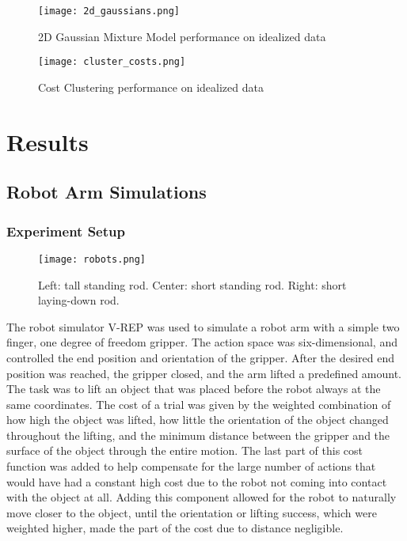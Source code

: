 \documentclass[12pt]{article}
\begin{document}
\begin{figure}[ht]
  \centerline{
  \texttt{[image: 2d\_gaussians.png]}}
  \caption{\label{fig_label} 2D Gaussian Mixture Model performance on idealized data}
  \label{fig:2Dgaussians}
\end{figure}

\begin{figure}[ht]
  \centerline{
  \texttt{[image: cluster\_costs.png]}}
  \caption{\label{fig_label} Cost Clustering performance on idealized data}
  \label{fig:clustercosts}
\end{figure}

\section{Results}
\subsection{Robot Arm Simulations}
\subsubsection{Experiment Setup}

\begin{figure}[ht]
  \centering
  \texttt{[image: robots.png]}
  \caption{\label{fig_label} Left: tall standing rod. Center: short standing rod. Right: short laying-down rod.
  \label{fig:robots}
  }
\end{figure}

The robot simulator V-REP was used to simulate a robot arm with a simple two finger, one degree of freedom gripper. The action space was six-dimensional, and controlled the end position and orientation of the gripper. After the desired end position was reached, the gripper closed, and the arm lifted a predefined amount. The task was to lift an object that was placed before the robot always at the same coordinates. The cost of a trial was given by the weighted combination of how high the object was lifted, how little the orientation of the object changed throughout the lifting, and the minimum distance between the gripper and the surface of the object through the entire motion. The last part of this cost function was added to help compensate for the large number of actions that would have had a constant high cost due to the robot not coming into contact with the object at all. Adding this component allowed for the robot to naturally move closer to the object, until the orientation or lifting success, which were weighted higher, made the part of the cost due to distance negligible. 
\end{document}
